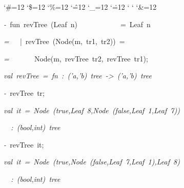 \begin{list}{}
{\setlength{\leftmargin}{\leftmargini}
\setlength{\rightmargin}{0cm}
\setlength{\itemindent}{0cm}
\setlength{\listparindent}{0cm}
\setlength{\itemsep}{0cm}
\setlength{\parsep}{0cm}
\setlength{\labelsep}{0cm}
\setlength{\labelwidth}{0cm}
\catcode`\#=12
\catcode`\$=12
\catcode`\%=12
\catcode`\^=12
\catcode`\_=12
\catcode`\.=12
\catcode`
\catcode`
\catcode`\&=12
\ttfamily}
\small
\item[]\textsl{-\ }fun\ revTree\ (Leaf\ n)\ \ \ \ \ \ \ \ \ \ \ \ =\ Leaf\ n
\item[]\textsl{=\ }\ \ |\ revTree\ (Node(m,\ tr1,\ tr2))\ =
\item[]\textsl{=\ }\ \ \ \ \ \ Node(m,\ revTree\ tr2,\ revTree\ tr1);
\item[]\textsl{val\ revTree\ =\ fn\ :\ ('a,'b)\ tree\ ->\ ('a,'b)\ tree}
\item[]\textsl{-\ }revTree\ tr;
\item[]\textsl{val\ it\ =\ Node\ (true,Leaf\ 8,Node\ (false,Leaf\ 1,Leaf\ 7))}
\item[]\textsl{\ \ :\ (bool,int)\ tree}
\item[]\textsl{-\ }revTree\ it;
\item[]\textsl{val\ it\ =\ Node\ (true,Node\ (false,Leaf\ 7,Leaf\ 1),Leaf\ 8)}
\item[]\textsl{\ \ :\ (bool,int)\ tree}
\end{list}
